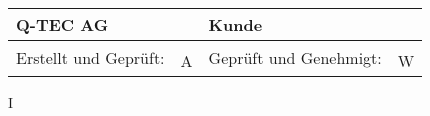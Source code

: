 \begin{tabularx}{\textwidth}{|X|X|X|X|}
	\hline
	\multicolumn{2}{|l|}{Q-TEC AG}&\multicolumn{2}{|l|}{Kunde}\\
	\hline
	\multirow{2}{*}{Erstellt und Geprüft:} & &\multirow{2}{*}{ Geprüft und Genehmigt:} & \\
	 &\qquad A & &\qquad W\\
	
\end{tabularx}






I%







